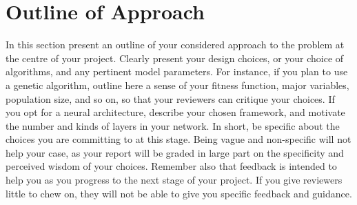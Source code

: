 \chapter{Outline of Approach}

In this section present an outline of your considered approach to the problem at the centre of your project. Clearly present your design choices, or your choice of algorithms, and any pertinent model parameters. For instance, if you plan to use a genetic algorithm, outline here a sense of your fitness function, major variables, population size, and so on, so that your reviewers can critique your choices. If you opt for a neural architecture, describe your chosen framework, and motivate the number and kinds of layers in your network. In short, be specific about the choices you are committing to at this stage. Being vague and non-specific will not help your case, as your report will be graded in large part on the specificity and perceived wisdom of your choices. Remember also that feedback is intended to help you as you progress to the next stage of your project. If you give reviewers little to chew on, they will not be able to give you specific feedback and guidance.
